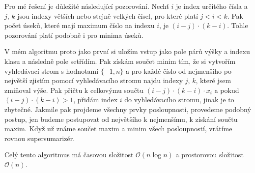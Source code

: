 \documentclass{fkssolpub}
\author{Ondřej Sedláček}
\begin{document}
Pro mé řešení je důležité následující pozorování. Nechť $i$ je index
určitého čísla a $j$, $k$ jsou indexy větších nebo stejně velkých čísel,
pro které platí $j < i < k$.
Pak počet úseků, které mají maximum číslo na indexu $i$, je
$(i - j) \cdot (k - i)$. Tohle pozorování platí podobně i pro minima úseků.

V mém algoritmu proto jako první si uložím vstup jako pole párů výšky a indexu
klasu a následně pole setřídím. Pak získám součet minim tím, že si vytvořím
vyhledávací strom s hodnotami $\{-1, n\}$ a pro každé číslo od nejmenšího
po největší zjistím pomocí vyhledávacího stromu najdu indexy $j$, $k$, které
jsem zmiňoval výše. Pak přičtu k celkovýmu součtu
$(i - j) \cdot (k - i) \cdot x_i$ a pokud $(i - j) \cdot (k - i) > 1$,
přidám index $i$ do vyhledávacího stromu, jinak je to zbytečné.
Jakmile pak projdeme všechny
prvky posloupnosti, provedeme podobný postup, jen budeme postupovat
od největšího k nejmenšímu, k získání součtu maxim.
Když už známe součet maxim a minim všech
posloupností, vrátíme rovnou supersumarizér.

Celý tento algoritmus má časovou složitost $\mathcal{O}(n \log n)$ a
prostorovou složitost $\mathcal{O}(n)$.
\end{document}
